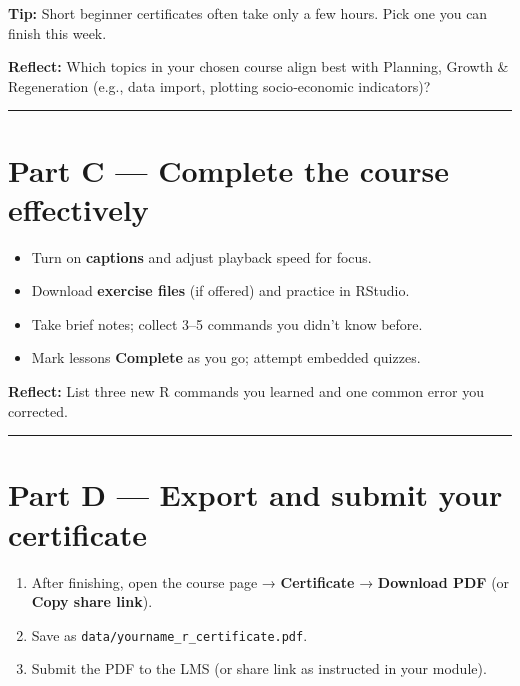 \documentclass[
  letterpaper,
  DIV=11,
  numbers=noendperiod]{scrreprt}
\providecommand{\tightlist}{%
  \setlength{\itemsep}{0pt}\setlength{\parskip}{0pt}}
\begin{document}
\textbf{Tip:} Short beginner certificates often take only a few hours.
Pick one you can finish this week.

\textbf{Reflect:} Which topics in your chosen course align best with
Planning, Growth \& Regeneration (e.g., data import, plotting
socio‑economic indicators)?

\begin{center}\rule{0.5\linewidth}{0.5pt}\end{center}

\section{Part C --- Complete the course
effectively}\label{part-c-complete-the-course-effectively}

\begin{itemize}
\tightlist
\item
  Turn on \textbf{captions} and adjust playback speed for focus.\\
\item
  Download \textbf{exercise files} (if offered) and practice in
  RStudio.\\
\item
  Take brief notes; collect 3--5 commands you didn't know before.\\
\item
  Mark lessons \textbf{Complete} as you go; attempt embedded quizzes.
\end{itemize}

\textbf{Reflect:} List three new R commands you learned and one common
error you corrected.

\begin{center}\rule{0.5\linewidth}{0.5pt}\end{center}

\section{Part D --- Export and submit your
certificate}\label{part-d-export-and-submit-your-certificate}

\begin{enumerate}
\def\labelenumi{\arabic{enumi}.}
\tightlist
\item
  After finishing, open the course page → \textbf{Certificate} →
  \textbf{Download PDF} (or \textbf{Copy share link}).\\
\item
  Save as \texttt{data/yourname\_r\_certificate.pdf}.\\
\item
  Submit the PDF to the LMS (or share link as instructed in your
  module).
\end{enumerate}
\end{document}

